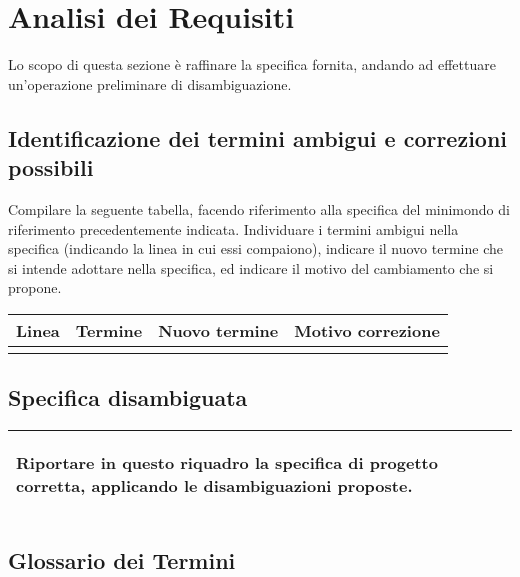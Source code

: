 \section{Analisi dei Requisiti}

\begin{templateblock}
    Lo scopo di questa sezione è raffinare la specifica fornita, andando ad
    effettuare un’operazione preliminare di disambiguazione.
\end{templateblock}

\subsection*{Identificazione dei termini ambigui e correzioni possibili}

\begin{templateblock}
    Compilare la seguente tabella, facendo riferimento alla specifica del
    minimondo di riferimento precedentemente indicata.
    Individuare i termini ambigui nella specifica
    (indicando la linea in cui essi compaiono), indicare il nuovo termine che
    si intende adottare nella specifica, ed indicare il motivo del cambiamento
    che si propone.
\end{templateblock}

\begin{tabularx}{\linewidth}{|c|c|c|Y|}
    \hline
    \textbf{Linea} & \textbf{Termine} & \textbf{Nuovo termine} & \textbf{Motivo correzione} \\\hline
                   &                  &                        &                                                     \\ \hline
\end{tabularx}

\subsection*{Specifica disambiguata}

\begin{tabularx}{\linewidth}{|X|}
    \hline
    \begin{templateblock}
        Riportare in questo riquadro la specifica di progetto corretta,
        applicando le disambiguazioni proposte.
    \end{templateblock}
    \\\hline
\end{tabularx}

\subsection*{Glossario dei Termini}

